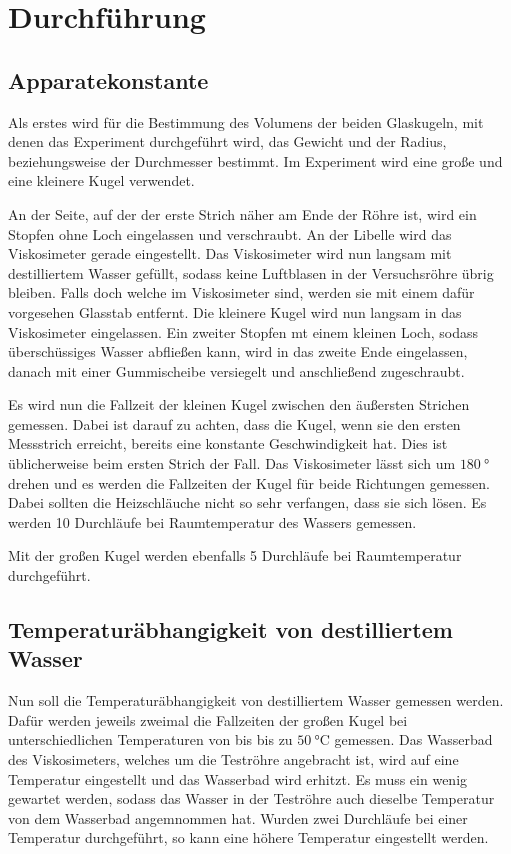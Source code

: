 \section{Durchführung}
\label{sec:Durchführung}

\subsection{Apparatekonstante}
\label{subsec:app}
Als erstes wird für die Bestimmung des Volumens der beiden Glaskugeln, mit denen das Experiment durchgeführt wird,
das Gewicht und der Radius, beziehungsweise der Durchmesser bestimmt. Im Experiment wird eine große und eine kleinere Kugel verwendet.

An der Seite, auf der der erste Strich näher am Ende der Röhre ist, wird ein Stopfen ohne Loch eingelassen und verschraubt.
An der Libelle wird das Viskosimeter gerade eingestellt.
Das Viskosimeter wird nun langsam mit destilliertem Wasser gefüllt, sodass keine Luftblasen in der Versuchsröhre %
übrig bleiben. Falls doch welche im Viskosimeter sind, werden sie mit einem dafür vorgesehen Glasstab entfernt. Die kleinere Kugel
wird nun langsam in das Viskosimeter eingelassen.
Ein zweiter Stopfen mt einem kleinen Loch, sodass überschüssiges Wasser abfließen kann, wird in das zweite Ende eingelassen, danach mit einer
Gummischeibe versiegelt und anschließend zugeschraubt.

Es wird nun die Fallzeit der kleinen Kugel zwischen den äußersten Strichen gemessen. Dabei ist darauf zu achten, dass die Kugel,
wenn sie den ersten Messstrich erreicht, bereits eine konstante Geschwindigkeit hat. Dies ist üblicherweise beim ersten Strich der Fall.
Das Viskosimeter lässt sich um $\SI{180}{\degree}$ drehen und es werden die Fallzeiten der Kugel für beide Richtungen gemessen. Dabei
sollten die Heizschläuche nicht so sehr verfangen, dass sie sich lösen.
Es werden 10 Durchläufe bei Raumtemperatur des Wassers gemessen.

Mit der großen Kugel werden ebenfalls 5 Durchläufe bei Raumtemperatur durchgeführt.

\subsection{Temperaturäbhangigkeit von destilliertem Wasser}
\label{subsec:tempAbh}

Nun soll die Temperaturäbhangigkeit von destilliertem Wasser gemessen werden. Dafür werden jeweils zweimal die Fallzeiten der großen Kugel bei
unterschiedlichen Temperaturen von bis bis zu $\SI{50}{\celsius}$ gemessen. 
Das Wasserbad des Viskosimeters, welches um die Teströhre angebracht ist, wird auf eine Temperatur eingestellt und das Wasserbad wird erhitzt.
Es muss ein wenig gewartet werden, sodass das Wasser in der Teströhre auch dieselbe Temperatur von dem Wasserbad angemnommen hat.
Wurden zwei Durchläufe bei einer Temperatur durchgeführt, so kann eine höhere Temperatur eingestellt werden.